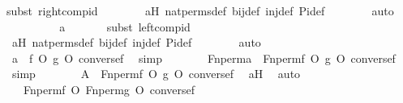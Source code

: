 \begin{isabellebody}
{\isacharparenleft}{\kern0pt}subst\ right{\isacharunderscore}{\kern0pt}comp{\isacharunderscore}{\kern0pt}id{\isacharparenright}{\kern0pt}\isanewline
\ \ \ \ \ \ \isamarkupfalse%
\ aH\ nat{\isacharunderscore}{\kern0pt}perms{\isacharunderscore}{\kern0pt}def\ bij{\isacharunderscore}{\kern0pt}def\ inj{\isacharunderscore}{\kern0pt}def\ Pi{\isacharunderscore}{\kern0pt}def\isanewline
\ \ \ \ \ \ \isamarkupfalse%
\ auto\isanewline
\ \ \ \ \isamarkupfalse%
\ \isamarkupfalse%
\ {\isachardoublequoteopen}{\isachardot}{\kern0pt}{\isachardot}{\kern0pt}{\isachardot}{\kern0pt}\ {\isacharequal}{\kern0pt}\ a{\isachardoublequoteclose}\isanewline
\ \ \ \ \ \ \isamarkupfalse%
{\isacharparenleft}{\kern0pt}subst\ left{\isacharunderscore}{\kern0pt}comp{\isacharunderscore}{\kern0pt}id{\isacharparenright}{\kern0pt}\isanewline
\ \ \ \ \ \ \isamarkupfalse%
\ aH\ nat{\isacharunderscore}{\kern0pt}perms{\isacharunderscore}{\kern0pt}def\ bij{\isacharunderscore}{\kern0pt}def\ inj{\isacharunderscore}{\kern0pt}def\ Pi{\isacharunderscore}{\kern0pt}def\isanewline
\ \ \ \ \ \ \isamarkupfalse%
\ auto\isanewline
\ \ \ \ \isamarkupfalse%
\ \isamarkupfalse%
\ {\isachardoublequoteopen}a\ {\isacharequal}{\kern0pt}\ f\ O\ g\ O\ converse{\isacharparenleft}{\kern0pt}f{\isacharparenright}{\kern0pt}{\isachardoublequoteclose}\ \isamarkupfalse%
\ simp\isanewline
\ \ \ \ \isamarkupfalse%
\ \isamarkupfalse%
\ {\isachardoublequoteopen}Fn{\isacharunderscore}{\kern0pt}perm{\isacharprime}{\kern0pt}{\isacharparenleft}{\kern0pt}a{\isacharparenright}{\kern0pt}\ {\isacharequal}{\kern0pt}\ Fn{\isacharunderscore}{\kern0pt}perm{\isacharprime}{\kern0pt}{\isacharparenleft}{\kern0pt}f\ O\ g\ O\ converse{\isacharparenleft}{\kern0pt}f{\isacharparenright}{\kern0pt}{\isacharparenright}{\kern0pt}{\isachardoublequoteclose}\ \isamarkupfalse%
\ simp\isanewline
\ \ \ \ \isamarkupfalse%
\ \isamarkupfalse%
\ {\isachardoublequoteopen}A\ {\isacharequal}{\kern0pt}\ Fn{\isacharunderscore}{\kern0pt}perm{\isacharprime}{\kern0pt}{\isacharparenleft}{\kern0pt}f\ O\ g\ O\ converse{\isacharparenleft}{\kern0pt}f{\isacharparenright}{\kern0pt}{\isacharparenright}{\kern0pt}{\isachardoublequoteclose}\ \isamarkupfalse%
\ aH\ \isamarkupfalse%
\ auto\isanewline
\ \ \ \ \isamarkupfalse%
\ \isamarkupfalse%
\ {\isachardoublequoteopen}{\isachardot}{\kern0pt}{\isachardot}{\kern0pt}{\isachardot}{\kern0pt}\ {\isacharequal}{\kern0pt}\ Fn{\isacharunderscore}{\kern0pt}perm{\isacharprime}{\kern0pt}{\isacharparenleft}{\kern0pt}f{\isacharparenright}{\kern0pt}\ O\ Fn{\isacharunderscore}{\kern0pt}perm{\isacharprime}{\kern0pt}{\isacharparenleft}{\kern0pt}g\ O\ converse{\isacharparenleft}{\kern0pt}f{\isacharparenright}{\kern0pt}{\isacharparenright}{\kern0pt}{\isachardoublequoteclose}\ \isanewline

\end{isabellebody}

